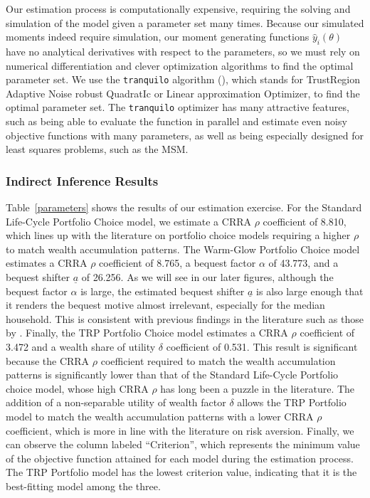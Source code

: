 \documentclass{article}
\newcommand{\CRRA}{\rho}
\begin{document}
Our estimation process is computationally expensive, requiring the solving and simulation of the model given a parameter set many times. Because our simulated moments indeed require simulation, our moment generating functions $\hat{y}_i(\theta)$ have no analytical derivatives with respect to the parameters, so we must rely on numerical differentiation and clever optimization algorithms to find the optimal parameter set. We use the \texttt{tranquilo} algorithm (\cite{Gabler2024}), which stands for TrustRegion Adaptive Noise robust QuadratIc or Linear approximation Optimizer, to find the optimal parameter set. The \texttt{tranquilo} optimizer has many attractive features, such as being able to evaluate the function in parallel and estimate even noisy objective functions with many parameters, as well as being especially designed for least squares problems, such as the MSM.

\subsubsection{Indirect Inference Results}

Table~\ref{parameters} shows the results of our estimation exercise. For the Standard Life-Cycle Portfolio Choice model, we estimate a CRRA $\CRRA$ coefficient of 8.810, which lines up with the literature on portfolio choice models requiring a higher $\CRRA$ to match wealth accumulation patterns. The Warm-Glow Portfolio Choice model estimates a CRRA $\CRRA$ coefficient of 8.765, a bequest factor $\alpha$ of 43.773, and a bequest shifter $\underline{a}$ of 26.256. As we will see in our later figures, although the bequest factor $\alpha$ is large, the estimated bequest shifter $\underline{a}$ is also large enough that it renders the bequest motive almost irrelevant, especially for the median household. This is consistent with previous findings in the literature such as those by \cite{deNardiBequest}. Finally, the TRP Portfolio Choice model estimates a CRRA $\CRRA$ coefficient of 3.472 and a wealth share of utility $\delta$ coefficient of 0.531. This result is significant because the CRRA $\CRRA$ coefficient required to match the wealth accumulation patterns is significantly lower than that of the Standard Life-Cycle Portfolio choice model, whose high CRRA $\CRRA$ has long been a puzzle in the literature. The addition of a non-separable utility of wealth factor $\delta$ allows the TRP Portfolio model to match the wealth accumulation patterns with a lower CRRA $\CRRA$ coefficient, which is more in line with the literature on risk aversion. Finally, we can observe the column labeled ``Criterion'', which represents the minimum value of the objective function attained for each model during the estimation process. The TRP Portfolio model has the lowest criterion value, indicating that it is the best-fitting model among the three.
\end{document}
